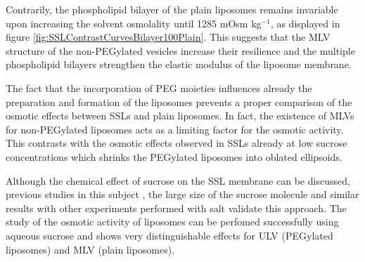 Contrarily, the phospholipid bilayer of the plain liposomes remains invariable upon increasing the solvent osmolality until 1285 mOsm kg$^{-1}$, as displayed in figure \ref{fig:SSLContrastCurvesBilayer100Plain}. This suggests that the MLV structure of the non-PEGylated vesicles increase their resilience and the multiple phospholipid bilayers strengthen the elastic modulus of the liposome membrane.

The fact that the incorporation of PEG moieties influences already the preparation and formation of the liposomes prevents a proper comparison of the osmotic effects between SSLs and plain liposomes. In fact, the existence of MLVs for non-PEGylated liposomes acts as a limiting factor for the osmotic activity. This contrasts with the osmotic effects observed in SSLs already at low sucrose concentrations which shrinks the PEGylated liposomes into oblated ellipsoids. 

Although the chemical effect of sucrose on the SSL membrane can be discussed, previous studies in this subject \cite{kiselev_does_2003, kiselev_sucrose_2001, kiselev_sucrose_2001-1}, the large size of the sucrose molecule and similar results with other experiments performed with salt \cite{varga_osmotic_2014} validate this approach. The study of the osmotic activity of liposomes can be perfomed successfully using aqueous sucrose and shows very distinguishable effects for ULV (PEGylated liposomes) and MLV (plain liposomes).






